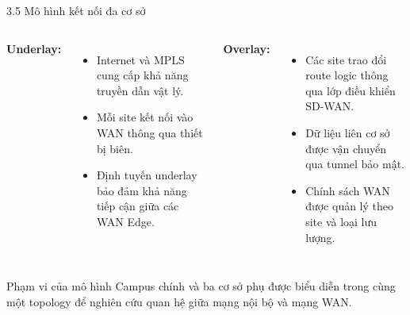\begin{frame}{3.5 Mô hình kết nối đa cơ sở}
    \begin{columns}[T]
        \textbf{Underlay:}
        \begin{itemize}
            \item Internet và MPLS cung cấp khả năng truyền dẫn vật lý.
            \item Mỗi site kết nối vào WAN thông qua thiết bị biên.
            \item Định tuyến underlay bảo đảm khả năng tiếp cận giữa các WAN Edge.
        \end{itemize}

        \textbf{Overlay:}
        \begin{itemize}
            \item Các site trao đổi route logic thông qua lớp điều khiển SD-WAN.
            \item Dữ liệu liên cơ sở được vận chuyển qua tunnel bảo mật.
            \item Chính sách WAN được quản lý theo site và loại lưu lượng.
        \end{itemize}
    \end{columns}
    \vspace{0.15cm}
    \begin{block}{Phạm vi của mô hình}
        Campus chính và ba cơ sở phụ được biểu diễn trong cùng một topology để nghiên cứu quan hệ giữa mạng nội bộ và mạng WAN.
    \end{block}
\end{frame}
